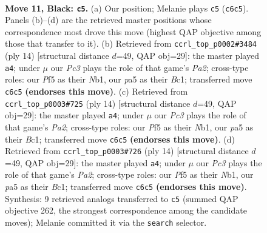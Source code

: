 \documentclass[11pt]{article}
\begin{document}
\clearpage

\begin{figure}[p]\centering
\begin{subfigure}{0.46\textwidth}\centering
\resizebox{\linewidth}{!}{%
\newchessgame
\chessboard[
  setfen={r1b2rk1/pp2q1pp/n1pb1n2/P2p1p2/3P3P/4PNP1/1P3PB1/RNBQ1RK1 b - - 0 11},
  showmover=false,
  pgfstyle=straightmove, color=movearrow, markmove={c6-c5}
]}
\caption{}
\end{subfigure}\hfill
\begin{subfigure}{0.46\textwidth}\centering
\resizebox{\linewidth}{!}{%
\newchessgame
\chessboard[
  setfen={rnbq1rk1/1pp1bppp/p3pn2/8/2pP4/5NP1/PPQ1PPBP/RNB2RK1 w - - 0 8},
  showmover=false,
  pgfstyle=straightmove, color=movearrow, markmove={a2-a4}
]}
\caption{}
\end{subfigure}
\\[4pt]
\begin{subfigure}{0.46\textwidth}\centering
\resizebox{\linewidth}{!}{%
\newchessgame
\chessboard[
  setfen={rnbq1rk1/1pp1bppp/p3pn2/8/2pP4/5NP1/PPQ1PPBP/RNB2RK1 w - - 0 8},
  showmover=false,
  pgfstyle=straightmove, color=movearrow, markmove={a2-a4}
]}
\caption{}
\end{subfigure}\hfill
\begin{subfigure}{0.46\textwidth}\centering
\resizebox{\linewidth}{!}{%
\newchessgame
\chessboard[
  setfen={rnbq1rk1/1pp1bppp/p3pn2/8/2pP4/5NP1/PPQ1PPBP/RNB2RK1 w - - 0 8},
  showmover=false,
  pgfstyle=straightmove, color=movearrow, markmove={a2-a4}
]}
\caption{}
\end{subfigure}
\caption{\textbf{Move 11, Black: \texttt{c5}.} (a) Our position; Melanie plays \texttt{c5} (\texttt{c6c5}). Panels (b)--(d) are the retrieved master positions whose correspondence most drove this move (highest QAP objective among those that transfer to it). (b) Retrieved from \texttt{ccrl\_top\_p0002\#3484} (ply 14) [structural distance $d$=49, QAP obj=29]: the master played \texttt{a4}; under $\mu$ our \emph{Pc3} plays the role of that game's \emph{Pa2}; cross-type roles: our \emph{P}f5 as their \emph{N}b1, our \emph{p}a5 as their \emph{B}c1; transferred move \texttt{c6c5} \textbf{(endorses this move)}. (c) Retrieved from \texttt{ccrl\_top\_p0003\#725} (ply 14) [structural distance $d$=49, QAP obj=29]: the master played \texttt{a4}; under $\mu$ our \emph{Pc3} plays the role of that game's \emph{Pa2}; cross-type roles: our \emph{P}f5 as their \emph{N}b1, our \emph{p}a5 as their \emph{B}c1; transferred move \texttt{c6c5} \textbf{(endorses this move)}. (d) Retrieved from \texttt{ccrl\_top\_p0003\#726} (ply 14) [structural distance $d$=49, QAP obj=29]: the master played \texttt{a4}; under $\mu$ our \emph{Pc3} plays the role of that game's \emph{Pa2}; cross-type roles: our \emph{P}f5 as their \emph{N}b1, our \emph{p}a5 as their \emph{B}c1; transferred move \texttt{c6c5} \textbf{(endorses this move)}. Synthesis: 9 retrieved analogs transferred to \texttt{c5} (summed QAP objective 262, the strongest correspondence among the candidate moves); Melanie committed it via the \texttt{search} selector.}
\label{fig:thought-m21}
\end{figure}
\end{document}
